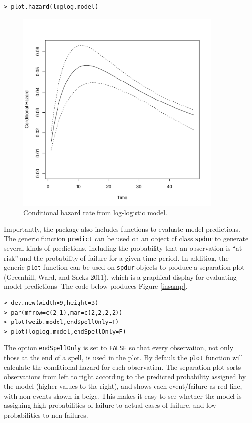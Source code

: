 \documentclass[article]{jss}
\begin{document}
\begin{verbatim}
> plot.hazard(loglog.model)
\end{verbatim}

\begin{figure}[htbp!]
\centering
\includegraphics[width=4in]{graphics/loglog_hazard.pdf}
\caption{Conditional hazard rate from log-logistic model.} \label{hazard}
\end{figure}

Importantly, the package also includes functions to evaluate model
predictions. The generic function \texttt{predict} can be used on an
object of class \texttt{spdur} to generate several kinds of predictions,
including the probability that an observation is ``at-risk'' and the
probability of failure for a given time period. In addition, the generic
\texttt{plot} function can be used on \texttt{spdur} objects to produce
a separation plot (Greenhill, Ward, and Sacks 2011), which is a
graphical display for evaluating model predictions. The code below
produces Figure \ref{insamp}. \small

\begin{verbatim}
> dev.new(width=9,height=3)
> par(mfrow=c(2,1),mar=c(2,2,2,2))
> plot(weib.model,endSpellOnly=F)
> plot(loglog.model,endSpellOnly=F)
\end{verbatim}

\normalsize
The option \texttt{endSpellOnly} is set to \texttt{FALSE} so that every
observation, not only those at the end of a spell, is used in the plot.
By default the \texttt{plot} function will calculate the conditional
hazard for each observation. The separation plot sorts observations from
left to right according to the predicted probability assigned by the
model (higher values to the right), and shows each event/failure as red
line, with non-events shown in beige. This makes it easy to see whether
the model is assigning high probabilities of failure to actual cases of
failure, and low probabilities to non-failures.
\end{document}
